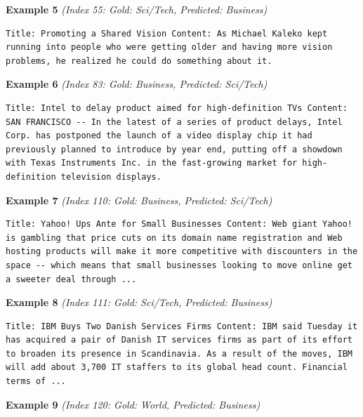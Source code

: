 \noindent
\textbf{Example 5} \quad \textit{(Index 55: Gold: Sci/Tech, Predicted: Business)}

\begin{Verbatim}[breaklines=true,breakanywhere=true,fontsize=\small]
Title: Promoting a Shared Vision Content: As Michael Kaleko kept running into people who were getting older and having more vision problems, he realized he could do something about it.
\end{Verbatim}

\noindent
\textbf{Example 6} \quad \textit{(Index 83: Gold: Business, Predicted: Sci/Tech)}

\begin{Verbatim}[breaklines=true,breakanywhere=true,fontsize=\small]
Title: Intel to delay product aimed for high-definition TVs Content: SAN FRANCISCO -- In the latest of a series of product delays, Intel Corp. has postponed the launch of a video display chip it had previously planned to introduce by year end, putting off a showdown with Texas Instruments Inc. in the fast-growing market for high-definition television displays.
\end{Verbatim}

\noindent
\textbf{Example 7} \quad \textit{(Index 110: Gold: Business, Predicted: Sci/Tech)}

\begin{Verbatim}[breaklines=true,breakanywhere=true,fontsize=\small]
Title: Yahoo! Ups Ante for Small Businesses Content: Web giant Yahoo! is gambling that price cuts on its domain name registration and Web hosting products will make it more competitive with discounters in the space -- which means that small businesses looking to move online get a sweeter deal through ...
\end{Verbatim}

\noindent
\textbf{Example 8} \quad \textit{(Index 111: Gold: Sci/Tech, Predicted: Business)}

\begin{Verbatim}[breaklines=true,breakanywhere=true,fontsize=\small]
Title: IBM Buys Two Danish Services Firms Content: IBM said Tuesday it has acquired a pair of Danish IT services firms as part of its effort to broaden its presence in Scandinavia. As a result of the moves, IBM will add about 3,700 IT staffers to its global head count. Financial terms of ...
\end{Verbatim}

\noindent
\textbf{Example 9} \quad \textit{(Index 120: Gold: World, Predicted: Business)}

